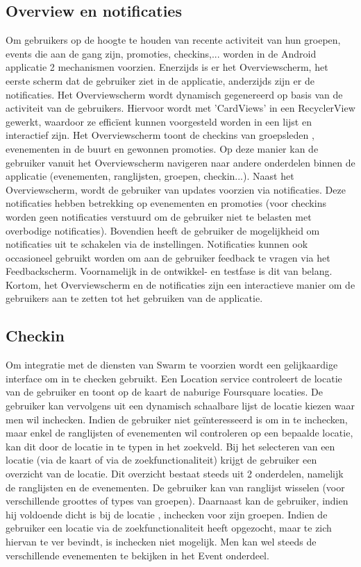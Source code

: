 \subsection{Overview en notificaties} %
Om gebruikers op de hoogte te houden van recente activiteit van hun groepen, events die aan de gang zijn, promoties, checkins,... worden in de Android applicatie 2 mechanismen voorzien. Enerzijds is er het Overviewscherm, het eerste scherm dat de gebruiker ziet in de applicatie, anderzijds zijn er de notificaties.
Het Overviewscherm wordt dynamisch gegenereerd op basis van de activiteit van de gebruikers. Hiervoor wordt met 'CardViews' in een RecyclerView gewerkt, waardoor ze efficïent kunnen voorgesteld worden in een lijst en interactief zijn. Het Overviewscherm toont de checkins van groepsleden , evenementen in de buurt en gewonnen promoties. Op deze manier kan de gebruiker vanuit het Overviewscherm navigeren naar andere onderdelen binnen de applicatie (evenementen, ranglijsten, groepen, checkin...).
Naast het Overviewscherm, wordt de gebruiker van updates voorzien via notificaties. Deze notificaties hebben betrekking op evenementen en promoties (voor checkins worden geen notificaties verstuurd om de gebruiker niet te belasten met overbodige notificaties). Bovendien heeft de gebruiker de mogelijkheid om notificaties uit te schakelen via de instellingen. Notificaties kunnen ook occasioneel gebruikt worden om aan de gebruiker feedback te vragen via het Feedbackscherm. Voornamelijk in de ontwikkel- en testfase is dit van belang.
Kortom, het Overviewscherm en de notificaties zijn een interactieve manier om de gebruikers aan te zetten tot het gebruiken van de applicatie.

\subsection{Checkin}%
Om integratie met de diensten van Swarm te voorzien wordt een gelijkaardige interface om in te checken gebruikt. Een Location service controleert de locatie van de gebruiker en toont op de kaart de naburige Foursquare locaties. De gebruiker kan vervolgens uit een dynamisch schaalbare lijst de locatie kiezen waar men wil inchecken. Indien de gebruiker niet geïnteresseerd is om in te inchecken, maar enkel de ranglijsten of evenementen wil controleren op een bepaalde locatie, kan dit door de locatie in te typen in het zoekveld. Bij het selecteren van een locatie (via de kaart of via de zoekfunctionaliteit) krijgt de gebruiker een overzicht van de locatie. Dit overzicht bestaat steeds uit 2 onderdelen, namelijk de ranglijsten en de evenementen. De gebruiker kan van ranglijst wisselen (voor verschillende groottes of types van groepen). Daarnaast kan de gebruiker, indien hij voldoende dicht is bij de locatie , inchecken voor zijn groepen. Indien de gebruiker een locatie via de zoekfunctionaliteit heeft opgezocht, maar te zich hiervan te ver bevindt, is inchecken niet mogelijk. Men kan wel steeds  de verschillende evenementen te bekijken in het Event onderdeel.
